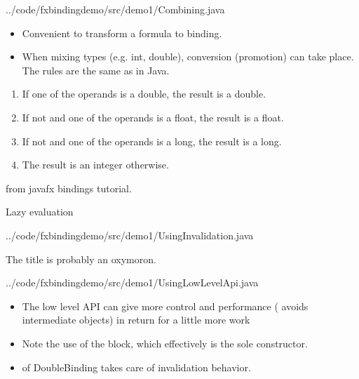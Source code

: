 \begin{frame}%

  {../code/fxbindingdemo/src/demo1/Combining.java}
  \begin{itemize}
  \item Convenient to transform a formula to binding.
  \item When mixing types (e.g. int, double), conversion (promotion)
    can take place. The rules are the same as in Java.
  \end{itemize}
  {\scriptsize
    \begin{enumerate}
    \item If one of the operands is a double, the result is a double.
    \item If not and one of the operands is a float, the result is a float.
    \item If not and one of the operands is a long, the result is a long.
    \item The result is an integer otherwise.
    \end{enumerate}
    from javafx bindings tutorial.
  }
\end{frame}

\begin{frame}{Lazy evaluation}

  {../code/fxbindingdemo/src/demo1/UsingInvalidation.java}


  The title is probably an oxymoron.
\end{frame}

\begin{frame}
  {../code/fxbindingdemo/src/demo1/UsingLowLevelApi.java}

{\scriptsize
  \begin{itemize}
  \item The low level API can give more control and performance (
    avoids intermediate objects)  in return for a little more work
  \item Note the use of the block, which effectively is the sole constructor.
  \item {} of DoubleBinding takes care of invalidation behavior. 
  \end{itemize}
}


\end{frame}
